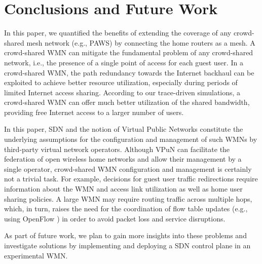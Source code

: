\section{Conclusions and Future Work}
\label{sec:conclusion}

In this paper, we quantified the benefits of extending the coverage of any crowd-shared mesh network (e.g., PAWS) by connecting the home routers as a mesh. A crowd-shared WMN can mitigate the fundamental problem of any crowd-shared network, i.e., the presence of a single point of access for each guest user. In a crowd-shared WMN, the path redundancy towards the Internet backhaul can be exploited to achieve better resource utilization, especially during periods of limited Internet access sharing. According to our trace-driven simulations, a crowd-shared WMN can offer much better utilization of the shared bandwidth, providing free Internet access to a larger number of users.

In this paper, SDN and the notion of Virtual Public Networks \cite{EWSDN} constitute the underlying assumptions for the configuration and management of such WMNs by third-party virtual network operators. Although VPuN can facilitate the federation of open wireless home networks and allow their management by a single operator, crowd-shared WMN configuration and management is certainly not a trivial task. For example, decisions for guest user traffic redirections require information about the WMN and access link utilization as well as home user sharing policies. A large WMN may require routing traffic across multiple hops, which, in turn, raises the need for the coordination of flow table updates (e.g., using OpenFlow \cite{OPENFLOW}) in order to avoid packet loss and service disruptions. 

As part of future work, we plan to gain more insights into these problems and investigate solutions by implementing and deploying a SDN control plane in an experimental WMN.  
